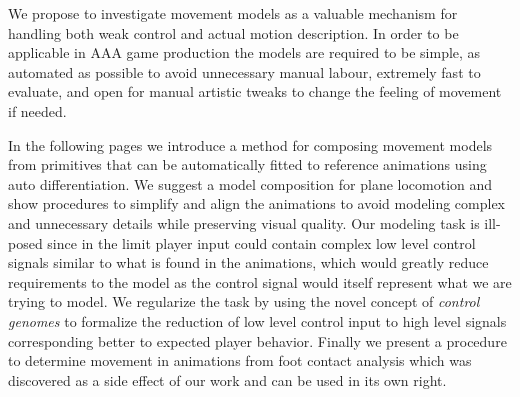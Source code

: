 We propose to investigate movement models as a valuable mechanism for handling both weak control and actual motion description. In order to be applicable in AAA game production the models are required to be simple, as automated as possible to avoid unnecessary manual labour, extremely fast to evaluate, and open for manual artistic tweaks to change the feeling of movement if needed.

In the following pages we introduce a method for composing movement models from primitives that can be automatically fitted to reference animations using auto differentiation. We suggest a model composition for plane locomotion and show procedures to simplify and align the animations to avoid modeling complex and unnecessary details while preserving visual quality. Our modeling task is ill-posed since in the limit player input could contain complex low level control signals similar to what is found in the animations, which would greatly reduce requirements to the model as the control signal would itself represent what we are trying to model. We regularize the task by using the novel concept of \textit{control genomes} to formalize the reduction of low level control input to high level signals corresponding better to expected player behavior. Finally we present a procedure to determine movement in animations from foot contact analysis which was discovered as a side effect of our work and can be used in its own right.

